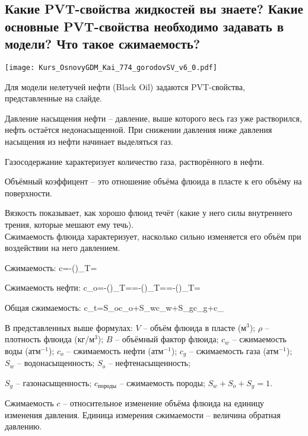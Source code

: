 

\subsection{Какие PVT-свойства жидкостей вы знаете? Какие основные PVT-свойства необходимо задавать в модели? Что такое сжимаемость?}

\texttt{[image: Kurs\_OsnovyGDM\_Kai\_774\_gorodovSV\_v6\_0.pdf]}

Для модели нелетучей нефти (Black Oil) задаются PVT-свойства, представленные на слайде.

Давление насыщения нефти -- давление, выше которого весь газ уже растворился, нефть остаётся недонасыщенной.
При снижении давления ниже давления насыщения из нефти начинает выделяться газ.

Газосодержание характеризует количество газа, растворённого в нефти.

Объёмный коэффицент -- это отношение объёма флюида в пласте к его объёму на поверхности.

Вязкость показывает, как хорошо флюид течёт (какие у него силы внутреннего трения, которые мешают ему течь).
\\

Сжимаемость флюида характеризует, насколько сильно изменяется его объём при воздействии на него давлением.

Сжимаемость:
\beq
c=-\left(\right)_{T=}
\eeq

Сжимаемость нефти:
\beq
c_o=-\left(\right)_{T=}=-\left(\right)_{T=}=-\left(\right)_{T=}
\eeq

Общая сжимаемость:
\beq
c_t=S_oc_o+S_wc_w+S_gc_g+c_{}
\eeq

В представленных выше формулах:
$V$ -- объём флюида в пласте (м$^3$);
$\rho$ -- плотность флюида (кг/м$^3$);
$B$ -- объёмный фактор флюида;
$c_w$ -- сжимаемость воды (атм$^{-1}$);
$c_o$ -- сжимаемость нефти (атм$^{-1}$);
$c_g$ -- сжимаемость газа (атм$^{-1}$);
$S_w$ -- водонасыщенность;
$S_o$ -- нефтенасыщенность;

$S_g$ -- газонасыщенность;
$c_\text{породы}$ -- сжимаемость породы;
$S_w+S_o+S_g=1$.

Сжимаемость $c$ -- относительное изменение объёма флюида на единицу изменения давления.
Единица измерения сжимаемости -- величина обратная давлению.
\\

